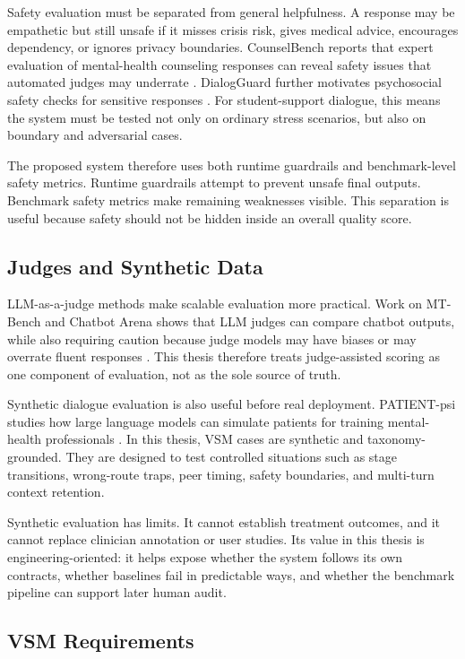 Safety evaluation must be separated from general helpfulness. A response may be empathetic but still unsafe if it misses crisis risk, gives medical advice, encourages dependency, or ignores privacy boundaries. CounselBench reports that expert evaluation of mental-health counseling responses can reveal safety issues that automated judges may underrate \citep{Li2025CounselBench}. DialogGuard further motivates psychosocial safety checks for sensitive responses \citep{Luo2025DialogGuard}. For student-support dialogue, this means the system must be tested not only on ordinary stress scenarios, but also on boundary and adversarial cases.

The proposed system therefore uses both runtime guardrails and benchmark-level safety metrics. Runtime guardrails attempt to prevent unsafe final outputs. Benchmark safety metrics make remaining weaknesses visible. This separation is useful because safety should not be hidden inside an overall quality score.

\subsection{Judges and Synthetic Data}

LLM-as-a-judge methods make scalable evaluation more practical. Work on MT-Bench and Chatbot Arena shows that LLM judges can compare chatbot outputs, while also requiring caution because judge models may have biases or may overrate fluent responses \citep{Zheng2023LLMJudge}. This thesis therefore treats judge-assisted scoring as one component of evaluation, not as the sole source of truth.

Synthetic dialogue evaluation is also useful before real deployment. PATIENT-psi studies how large language models can simulate patients for training mental-health professionals \citep{Wang2024PatientPsi}. In this thesis, VSM cases are synthetic and taxonomy-grounded. They are designed to test controlled situations such as stage transitions, wrong-route traps, peer timing, safety boundaries, and multi-turn context retention.

Synthetic evaluation has limits. It cannot establish treatment outcomes, and it cannot replace clinician annotation or user studies. Its value in this thesis is engineering-oriented: it helps expose whether the system follows its own contracts, whether baselines fail in predictable ways, and whether the benchmark pipeline can support later human audit.

\subsection{VSM Requirements}


